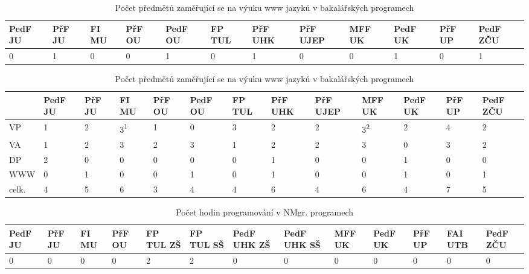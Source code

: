 \documentclass[FP,DP]{tulthesis}
\begin{document}
{{{{{{{\begin{table}[]
\centering
\scriptsize
\caption{Počet předmětů zaměřující se na výuku www jazyků v bakalářských programech}
\label{my-label}
\begin{tabular}{|C{0.7cm}|C{0.7cm}|C{0.7cm}|C{0.7cm}|C{0.7cm}|C{0.8cm}|C{0.7cm}|C{0.7cm}|C{0.7cm}|C{0.7cm}|C{0.7cm}|C{0.7cm}|}
\hline
PedF
JU & PřF JU & FI MU & PřF OU & PedF OU &FP TUL& PřF UHK & PřF UJEP & MFF UK & PedF UK & PřF UP & PedF ZČU \\        &1   &0   &0     &1       &0   &1   & 0       &0      &1       & 0    &1        \\ \hline
\end{tabular}
\end{table}
\begin{table}[]
\centering
\scriptsize
\caption{Počet předmětů zaměřující se na výuku www jazyků v bakalářských programech}
\label{my-label}
\begin{tabular}{C{1cm}C{0.7cm}C{0.7cm}C{0.7cm}C{0.7cm}C{0.7cm}C{0.8cm}C{0.7cm}C{0.7cm}C{0.7cm}C{0.7cm}C{0.7cm}C{0.7cm}}
\toprule
&PedF JU & PřF JU & FI MU & PřF OU & PedF OU &FP TUL& PřF UHK & PřF UJEP & MFF UK & PedF UK & PřF UP & PedF ZČU \\ \midrule
VP&1       & 2      & 3\textsuperscript{1}     & 1      & 0      & 3        &2       & 2        & 3\textsuperscript{2}       &2       & 4      &2        \\ 
VA&1       &2   &3   &2     &3       &1   &2   & 2       &3      &0       & 3    &2       \\ 
DP&2       &0   &0   &0     &0       &0   &1   & 0       &0      &1       & 0    &0        \\ 
WWW&0       &1   &0   &0     &1       &0   &1   & 0       &0      &1       & 0    &1        \\ \midrule

celk.&4       &5   &6   &3   &4       &4   &6   & 4       &6      &4       & 7    &5        \\  \bottomrule
\end{tabular}
\end{table}


\begin{table}[]
\centering
\scriptsize
\caption{Počet hodin programování v NMgr. programech}
\label{my-label}
\begin{tabular}{|C{0.7cm}|C{0.7cm}|C{0.7cm}|C{0.7cm}|C{0.7cm}|C{0.8cm}|C{0.7cm}|C{0.7cm}|C{0.7cm}|C{0.7cm}|C{0.7cm}|C{0.7cm}|C{0.7cm}|}
\hline
PedF
JU & PřF JU & FI MU & PřF OU &FP TUL ZŠ&FP TUL SŠ& PedF UHK ZŠ& PedF UHK SŠ & MFF UK & PedF UK & PřF UP & FAI UTB& PedF ZČU \\       & 0    &0     &0  & 2       & 2        &0     & 0     &0     &0       &0     &0  &0      \\ \hline
\end{tabular}
\end{table}




}}}}}}}
\end{document}
